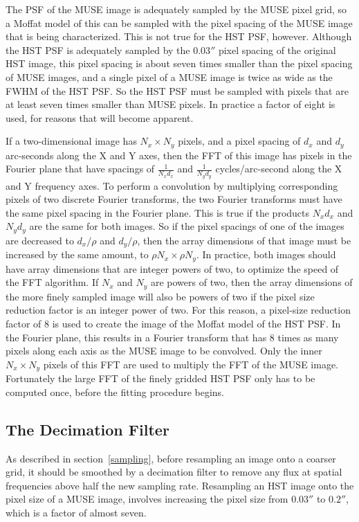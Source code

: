 \documentclass[12pt,twoside,a4paper]{article}
\newcommand{\arcsec}{''}
\begin{document}
The PSF of the MUSE image is adequately sampled by the MUSE pixel
grid, so a Moffat model of this can be sampled with the pixel spacing
of the MUSE image that is being characterized. This is not true for
the HST PSF, however. Although the HST PSF is adequately sampled by
the $0.03\arcsec$ pixel spacing of the original HST image, this pixel
spacing is about seven times smaller than the pixel spacing of MUSE
images, and a single pixel of a MUSE image is twice as wide as the
FWHM of the HST PSF. So the HST PSF must be sampled with pixels that
are at least seven times smaller than MUSE pixels. In practice a
factor of eight is used, for reasons that will become apparent.

If a two-dimensional image has $N_x \times N_y$ pixels, and a pixel
spacing of $d_x$ and $d_y$ arc-seconds along the X and Y axes, then
the FFT of this image has pixels in the Fourier plane that have
spacings of $\frac{1}{N_x d_x}$ and $\frac{1}{N_y d_y}$
cycles/arc-second along the X and Y frequency axes. To perform a
convolution by multiplying corresponding pixels of two discrete
Fourier transforms, the two Fourier transforms must have the same
pixel spacing in the Fourier plane. This is true if the products $N_x
d_x$ and $N_y d_y$ are the same for both images. So if the pixel
spacings of one of the images are decreased to $d_x/\rho$ and
$d_y/\rho$, then the array dimensions of that image must be increased
by the same amount, to $\rho N_x \times \rho N_y$. In practice, both
images should have array dimensions that are integer powers of two, to
optimize the speed of the FFT algorithm. If $N_x$ and $N_y$ are powers
of two, then the array dimensions of the more finely sampled image
will also be powers of two if the pixel size reduction factor is an
integer power of two. For this reason, a pixel-size reduction factor
of 8 is used to create the image of the Moffat model of the HST
PSF. In the Fourier plane, this results in a Fourier transform that
has 8 times as many pixels along each axis as the MUSE image to be
convolved. Only the inner $N_x \times N_y$ pixels of this FFT are used
to multiply the FFT of the MUSE image. Fortunately the large FFT of
the finely gridded HST PSF only has to be computed once, before the
fitting procedure begins.

\subsection{The Decimation Filter}

As described in section~\ref{sampling}, before resampling an image
onto a coarser grid, it should be smoothed by a decimation filter to
remove any flux at spatial frequencies above half the new sampling
rate. Resampling an HST image onto the pixel size of a MUSE image,
involves increasing the pixel size from $0.03\arcsec$ to $0.2\arcsec$,
which is a factor of almost seven.
\end{document}
